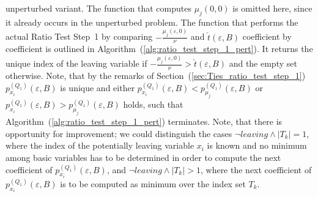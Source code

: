 \documentclass[a4paper]{article}
\newcommand{\pmu}[2]{\ensuremath{p_{\mu_{j}}^{(#1)}(\varepsilon, #2)}}
\newcommand{\px}[3]{\ensuremath{p_{x_{#1}}^{(#2)}(\varepsilon, #3)}}
\begin{document}
unperturbed variant.
The function that computes $\mu_{j}(0,0)$ is omitted here, since it already
occurs in the unperturbed problem.
The function that performs the actual Ratio Test Step~1 by comparing
$-\frac{\mu_{j}(\varepsilon, 0)}{\nu}$ and $\check{t}(\varepsilon,B)$
coefficient by coefficient is outlined in
Algorithm~(\ref{alg:ratio_test_step_1_pert}). It returns the unique index of
the leaving variable if
$-\frac{\mu_{j}(\varepsilon, 0)}{\nu} > \check{t}(\varepsilon,B)$ and the empty
set otherwise. Note, that by the remarks of
Section~(\ref{sec:Ties_ratio_test_step_1}) \px{i}{Q_{1}}{B} is unique and
either $\px{i}{Q_{1}}{B} < \pmu{Q_{1}}{B}$ or
$\px{i}{Q_{1}}{B} > \pmu{Q_{1}}{B}$
holds, such that Algorithm~(\ref{alg:ratio_test_step_1_pert}) terminates.
Note, that there is opportunity for improvement; we could distinguish the cases
$\neg leaving \wedge \left|T_{k}\right|=1$, where the index of the potentially
leaving variable $x_{i}$ is known and no minimum among basic variables has to
be determined in order to compute the next coefficient of \px{i}{Q_{1}}{B}, and
$\neg leaving \wedge \left|T_{k}\right|>1$, where the next coefficient of
\px{i}{Q_{1}}{B} is to be computed as minimum over the index set $T_{k}$.
\end{document}
